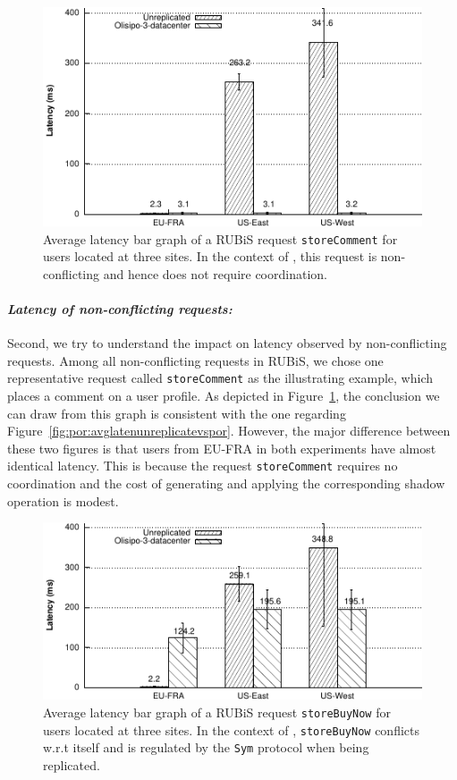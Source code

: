 \begin{figure}[t!]
  \centering
\includegraphics[width=0.85\columnwidth]{figures/eval/avg_latency_storecomment_unreplicated_vs_por.pdf}
  \caption{Average latency bar graph of a RUBiS request {\tt storeComment} for users located at three sites. In
  the context of \PRCN, this request is non-conflicting and hence does not require coordination.}
 \label{fig:por:avglatennfunreplicatevspor}
\end{figure}

\paragraph{{\em Latency of non-conflicting requests: }}Second, we try to understand the impact
on latency observed by non-conflicting requests. Among all non-conflicting requests in RUBiS,
we chose one representative request called {\tt storeComment} as the illustrating example, which places
a comment on a user profile. As depicted in Figure~\ref{fig:por:avglatennfunreplicatevspor}, the conclusion we can draw from this graph
is consistent with the one regarding Figure~\ref{fig:por:avglatenunreplicatevspor}. However, the major
difference between these two figures is that users from EU-FRA in both experiments have almost identical
latency. This is because the request {\tt storeComment} requires no coordination and the cost of 
generating and applying the corresponding shadow operation is modest.

\begin{figure}[t!]
  \centering
\includegraphics[width=0.85\columnwidth]{figures/eval/avg_latency_sym_storebuynow_unreplicated_vs_por.pdf}
  \caption{Average latency bar graph of a RUBiS request {\tt storeBuyNow} for 
  users located at three sites. In
  the context of \PRCN, {\tt storeBuyNow} conflicts w.r.t itself and is regulated by the {\tt Sym} protocol when being replicated.}
 \label{fig:por:avglatensymunreplicatevspor}
\end{figure}

